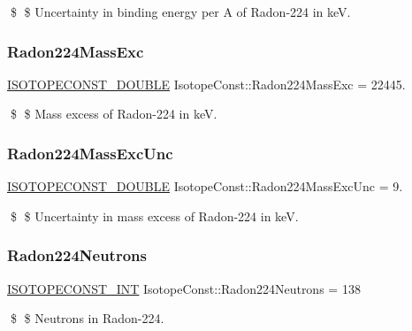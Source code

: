 \$ \$ Uncertainty in binding energy per A of Radon-\/224 in keV. \mbox{\label{group___isotope_const-_radon-_rn224_ga06a47e5067714fcc25ce4bb2b4e84c1e}} 
\subsubsection{\texorpdfstring{Radon224\+Mass\+Exc}{Radon224MassExc}}
{\footnotesize\ttfamily \mbox{\hyperlink{group___isotope_const-_macros_ga8f45a7272ce02c0b4c65c44636ed719a}{I\+S\+O\+T\+O\+P\+E\+C\+O\+N\+S\+T\+\_\+\+D\+O\+U\+B\+LE}} Isotope\+Const\+::\+Radon224\+Mass\+Exc = 22445.}

\$ \$ Mass excess of Radon-\/224 in keV. \mbox{\label{group___isotope_const-_radon-_rn224_ga7cdb5f5ee8054f14055c5ce7eebc862f}} 
\subsubsection{\texorpdfstring{Radon224\+Mass\+Exc\+Unc}{Radon224MassExcUnc}}
{\footnotesize\ttfamily \mbox{\hyperlink{group___isotope_const-_macros_ga8f45a7272ce02c0b4c65c44636ed719a}{I\+S\+O\+T\+O\+P\+E\+C\+O\+N\+S\+T\+\_\+\+D\+O\+U\+B\+LE}} Isotope\+Const\+::\+Radon224\+Mass\+Exc\+Unc = 9.}

\$ \$ Uncertainty in mass excess of Radon-\/224 in keV. \mbox{\label{group___isotope_const-_radon-_rn224_ga6cb3873adc7e7a927e28786b482a9480}} 
\subsubsection{\texorpdfstring{Radon224\+Neutrons}{Radon224Neutrons}}
{\footnotesize\ttfamily \mbox{\hyperlink{group___isotope_const-_macros_ga5f18360b3e99483a35c32d789e62621c}{I\+S\+O\+T\+O\+P\+E\+C\+O\+N\+S\+T\+\_\+\+I\+NT}} Isotope\+Const\+::\+Radon224\+Neutrons = 138}

\$ \$ Neutrons in Radon-\/224. \mbox{\label{group___isotope_const-_radon-_rn224_ga3c0185f2e5d785e3fde9c56ef51a2580}} 

